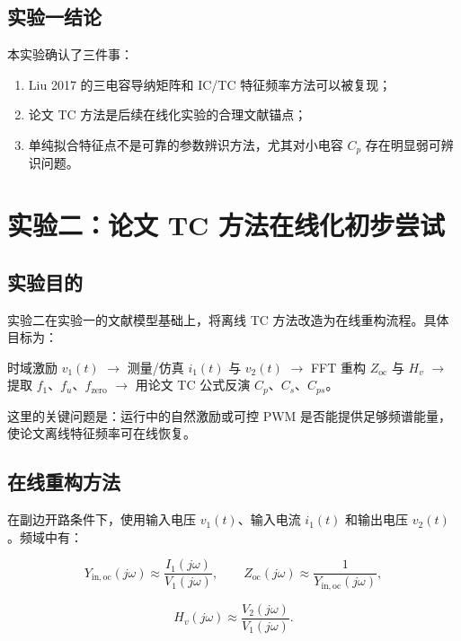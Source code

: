 \documentclass[UTF8,a4paper,12pt]{ctexart}
\begin{document}
\subsection{实验一结论}

本实验确认了三件事：

\begin{enumerate}
  \item Liu 2017 的三电容导纳矩阵和 IC/TC 特征频率方法可以被复现；
  \item 论文 TC 方法是后续在线化实验的合理文献锚点；
  \item 单纯拟合特征点不是可靠的参数辨识方法，尤其对小电容 $C_p$ 存在明显弱可辨识问题。
\end{enumerate}

\section{实验二：论文 TC 方法在线化初步尝试}

\subsection{实验目的}

实验二在实验一的文献模型基础上，将离线 TC 方法改造为在线重构流程。具体目标为：

\begin{center}
时域激励 $v_1(t)$
$\rightarrow$
测量/仿真 $i_1(t)$ 与 $v_2(t)$
$\rightarrow$
FFT 重构 $Z_{\mathrm{oc}}$ 与 $H_v$
$\rightarrow$
提取 $f_1$、$f_u$、$f_{\mathrm{zero}}$
$\rightarrow$
用论文 TC 公式反演 $C_p$、$C_s$、$C_{ps}$。
\end{center}

这里的关键问题是：运行中的自然激励或可控 PWM 是否能提供足够频谱能量，使论文离线特征频率可在线恢复。

\subsection{在线重构方法}

在副边开路条件下，使用输入电压 $v_1(t)$、输入电流 $i_1(t)$ 和输出电压 $v_2(t)$。频域中有：

\begin{equation}
Y_{\mathrm{in,oc}}(j\omega) \approx \frac{I_1(j\omega)}{V_1(j\omega)}, \qquad
Z_{\mathrm{oc}}(j\omega) \approx \frac{1}{Y_{\mathrm{in,oc}}(j\omega)},
\end{equation}

\begin{equation}
H_v(j\omega) \approx \frac{V_2(j\omega)}{V_1(j\omega)}.
\end{equation}
\end{document}
